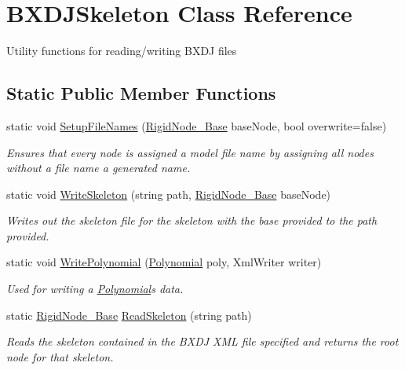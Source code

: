 \hypertarget{class_b_x_d_j_skeleton}{}\section{B\+X\+D\+J\+Skeleton Class Reference}
\label{class_b_x_d_j_skeleton}


Utility functions for reading/writing B\+X\+DJ files  


\subsection*{Static Public Member Functions}
\begin{DoxyCompactItemize}
\item 
static void \hyperlink{class_b_x_d_j_skeleton_abe03be6363ab87421b757bb83bf81d39}{Setup\+File\+Names} (\hyperlink{class_rigid_node___base}{Rigid\+Node\+\_\+\+Base} base\+Node, bool overwrite=false)
\begin{DoxyCompactList}\small\item\em Ensures that every node is assigned a model file name by assigning all nodes without a file name a generated name. \end{DoxyCompactList}\item 
static void \hyperlink{class_b_x_d_j_skeleton_a51284ed9f19393c90ac2fb0f854880f4}{Write\+Skeleton} (string path, \hyperlink{class_rigid_node___base}{Rigid\+Node\+\_\+\+Base} base\+Node)
\begin{DoxyCompactList}\small\item\em Writes out the skeleton file for the skeleton with the base provided to the path provided. \end{DoxyCompactList}\item 
static void \hyperlink{class_b_x_d_j_skeleton_a19a49fdfc8bc3aca9b61adde4897900c}{Write\+Polynomial} (\hyperlink{class_polynomial}{Polynomial} poly, Xml\+Writer writer)
\begin{DoxyCompactList}\small\item\em Used for writing a \hyperlink{class_polynomial}{Polynomial}\textquotesingle{}s data. \end{DoxyCompactList}\item 
static \hyperlink{class_rigid_node___base}{Rigid\+Node\+\_\+\+Base} \hyperlink{class_b_x_d_j_skeleton_a36b0456f8c3439733374cf05bb91e41f}{Read\+Skeleton} (string path)
\begin{DoxyCompactList}\small\item\em Reads the skeleton contained in the B\+X\+DJ X\+ML file specified and returns the root node for that skeleton. \end{DoxyCompactList}\item 

\end{DoxyCompactItemize}
